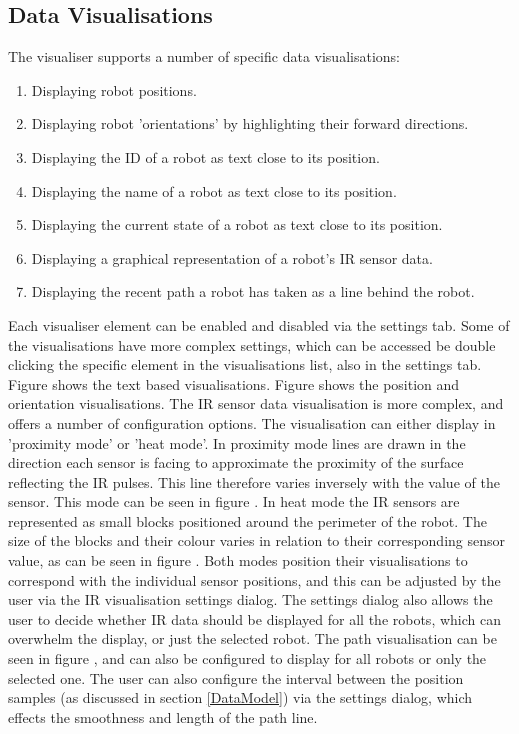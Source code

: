 \subsection{Data Visualisations}
The visualiser supports a number of specific data visualisations:

\begin{enumerate}
 \item Displaying robot positions.
 \item Displaying robot 'orientations' by highlighting their forward directions.
 \item Displaying the ID of a robot as text close to its position.
 \item Displaying the name of a robot as text close to its position.
 \item Displaying the current state of a robot as text close to its position.
 \item Displaying a graphical representation of a robot's IR sensor data.
 \item Displaying the recent path a robot has taken as a line behind the robot.
\end{enumerate}

Each visualiser element can be enabled and disabled via the settings tab. Some of the visualisations have more complex settings, which can be accessed be double clicking the specific element in the visualisations list, also in the settings tab. Figure  shows the text based visualisations. Figure  shows the position and orientation visualisations. The IR sensor data visualisation is more complex, and offers a number of configuration options. The visualisation can either display in 'proximity mode' or 'heat mode'. In proximity mode lines are drawn in the direction each sensor is facing to approximate the proximity of the surface reflecting the IR pulses. This line therefore varies inversely with the value of the sensor. This mode can be seen in figure . In heat mode the IR sensors are represented as small blocks positioned around the perimeter of the robot. The size of the blocks and their colour varies in relation to their corresponding sensor value, as can be seen in figure . Both modes position their visualisations to correspond with the individual sensor positions, and this can be adjusted by the user via the IR visualisation settings dialog. The settings dialog also allows the user to decide whether IR data should be displayed for all the robots, which can overwhelm the display, or just the selected robot. The path visualisation can be seen in figure , and can also be configured to display for all robots or only the selected one. The user can also configure the interval between the position samples (as discussed in section \ref{DataModel}) via the settings dialog, which effects the smoothness and length of the path line.

